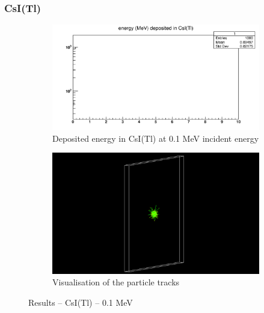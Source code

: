 \documentclass{article}
\begin{document}
\subsubsection{CsI(Tl)}
\begin{figure}[H]
\centering
\begin{subfigure}{.5\textwidth}
  \centering
  \includegraphics[width=\linewidth]{images/task1/CsI_01MeV.png}
  \caption{Deposited energy in CsI(Tl) at 0.1 MeV incident energy}
\end{subfigure}%
\begin{subfigure}{.5\textwidth}
  \centering
  \includegraphics[width=\linewidth]{images/task1/CsI_01MeV_1000.png}
  \caption{Visualisation of the particle tracks}
\end{subfigure}
\caption{Results – CsI(Tl) – 0.1 MeV}
\end{figure}
\end{document}
